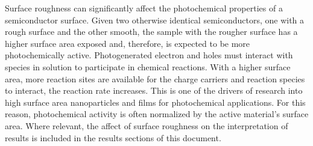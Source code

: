 \documentclass[12pt,%
              twoside,
               letterpaper]{uiothesis}
\begin{document}
Surface roughness can significantly affect the photochemical properties of a semiconductor
surface. Given two otherwise identical semiconductors, one with a rough surface and the
other smooth, the sample with the rougher surface has a higher surface area exposed and,
therefore, is expected to be more photochemically active. Photogenerated electron and
holes must interact with species in solution to participate in chemical reactions. With a
higher surface area, more reaction sites are available for the charge carriers and
reaction species to interact, the reaction rate increases. This is one of the drivers of
research into high surface area nanoparticles and films for photochemical
applications.\cite{Kudo:2008fk} For this reason, photochemical activity is often
normalized by the active material's surface area. Where relevant, the affect of surface
roughness on the interpretation of results is included in the results sections of this
document.

%
%
%
%
%
%
\end{document}
